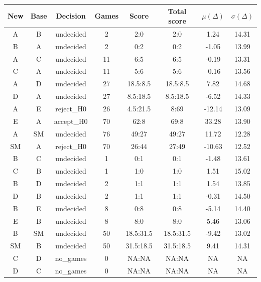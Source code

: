 \begin{table}[htbp]
    \begin{tabular}{cccccccc}
        \hline
        \textbf{New} & \textbf{Base} & \textbf{Decision} & \textbf{Games} & \textbf{Score} & \textbf{Total score} & \textbf{$\mu(\Delta)$} & \textbf{$\sigma(\Delta)$} \\
        \hline
        A  & B  & undecided & 2  & 2:0       & 2:0       & 1.24   & 14.31 \\
        B  & A  & undecided & 2  & 0:2       & 0:2       & -1.05  & 13.99 \\
        A  & C  & undecided & 11 & 6:5       & 6:5       & -0.19  & 13.31 \\
        C  & A  & undecided & 11 & 5:6       & 5:6       & -0.16  & 13.56 \\
        A  & D  & undecided & 27 & 18.5:8.5  & 18.5:8.5  & 7.82   & 14.68 \\
        D  & A  & undecided & 27 & 8.5:18.5  & 8.5:18.5  & -6.52  & 14.33 \\
        A  & E  & reject\_H0 & 26 & 4.5:21.5  & 8:69      & -12.14 & 13.09 \\
        E  & A  & accept\_H0 & 70 & 62:8      & 69:8      & 33.28  & 13.90 \\
        A  & SM & undecided & 76 & 49:27     & 49:27     & 11.72  & 12.28 \\
        SM & A  & reject\_H0 & 70 & 26:44     & 27:49     & -10.63 & 12.52 \\
        B  & C  & undecided & 1  & 0:1       & 0:1       & -1.48  & 13.61 \\
        C  & B  & undecided & 1  & 1:0       & 1:0       & 1.51   & 15.02 \\
        B  & D  & undecided & 2  & 1:1       & 1:1       & 1.54   & 13.85 \\
        D  & B  & undecided & 2  & 1:1       & 1:1       & -0.31  & 14.50 \\
        B  & E  & undecided & 8  & 0:8       & 0:8       & -5.14  & 14.40 \\
        E  & B  & undecided & 8  & 8:0       & 8:0       & 5.46   & 13.06 \\
        B  & SM & undecided & 50 & 18.5:31.5 & 18.5:31.5 & -9.42  & 13.02 \\
        SM & B  & undecided & 50 & 31.5:18.5 & 31.5:18.5 & 9.41   & 14.31 \\
        C  & D  & no\_games  & 0  & NA:NA     & NA:NA     & NA     & NA    \\
        D  & C  & no\_games  & 0  & NA:NA     & NA:NA     & NA     & NA    \\

\end{tabular}
\end{table}
